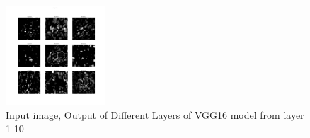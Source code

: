 \documentclass{article}
\begin{document}
{{\begin{figure}[htp]
\begin{overprint}
                \includegraphics[width=0.33\textwidth]{Assignment-12/fig-10.jpg}
            \end{overprint}
            \caption{Input image, Output of Different Layers of VGG16 model from layer 1-10}
        \end{figure}
    }
}
\clearpage

\end{document}
